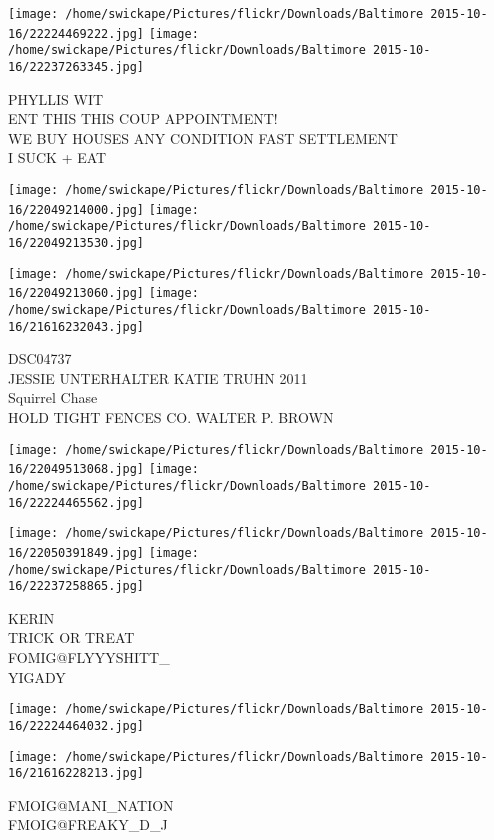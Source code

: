 \documentclass[10pt,letterpaper]{article}
\begin{document}
\texttt{[image: /home/swickape/Pictures/flickr/Downloads/Baltimore 2015-10-16/22224469222.jpg]}
\texttt{[image: /home/swickape/Pictures/flickr/Downloads/Baltimore 2015-10-16/22237263345.jpg]}

PHYLLIS WIT\\
ENT THIS THIS COUP APPOINTMENT!\\
WE BUY HOUSES ANY CONDITION FAST SETTLEMENT\\
I SUCK + EAT\\
\pagebreak

\texttt{[image: /home/swickape/Pictures/flickr/Downloads/Baltimore 2015-10-16/22049214000.jpg]}
\texttt{[image: /home/swickape/Pictures/flickr/Downloads/Baltimore 2015-10-16/22049213530.jpg]}

\texttt{[image: /home/swickape/Pictures/flickr/Downloads/Baltimore 2015-10-16/22049213060.jpg]}
\texttt{[image: /home/swickape/Pictures/flickr/Downloads/Baltimore 2015-10-16/21616232043.jpg]}

DSC04737\\
JESSIE UNTERHALTER KATIE TRUHN 2011\\
Squirrel Chase\\
HOLD TIGHT FENCES CO. WALTER P. BROWN\\
\pagebreak

\texttt{[image: /home/swickape/Pictures/flickr/Downloads/Baltimore 2015-10-16/22049513068.jpg]}
\texttt{[image: /home/swickape/Pictures/flickr/Downloads/Baltimore 2015-10-16/22224465562.jpg]}

\texttt{[image: /home/swickape/Pictures/flickr/Downloads/Baltimore 2015-10-16/22050391849.jpg]}
\texttt{[image: /home/swickape/Pictures/flickr/Downloads/Baltimore 2015-10-16/22237258865.jpg]}

KERIN\\
TRICK OR TREAT\\
FOMIG@FLYYYSHITT\_\\
YIGADY\\
\pagebreak

\texttt{[image: /home/swickape/Pictures/flickr/Downloads/Baltimore 2015-10-16/22224464032.jpg]}

\vspace{0.25in}
\texttt{[image: /home/swickape/Pictures/flickr/Downloads/Baltimore 2015-10-16/21616228213.jpg]}

FMOIG@MANI\_NATION\\
FMOIG@FREAKY\_D\_J\\
\pagebreak
\end{document}
